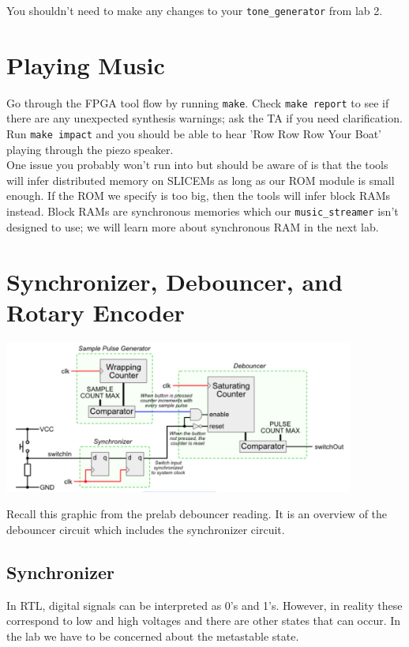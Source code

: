 \documentclass[11pt]{article}
\begin{document}
You shouldn't need to make any changes to your \verb|tone_generator| from lab 2.

\section{Playing Music}
Go through the FPGA tool flow by running \verb|make|. Check \verb|make report| to see if there are any unexpected synthesis warnings; ask the TA if you need clarification. Run \verb|make impact| and you should be able to hear 'Row Row Row Your Boat' playing through the piezo speaker. \\

{\footnotesize * One issue you probably won't run into but should be aware of is that the tools will infer distributed memory on SLICEMs as long as our ROM module is small enough. If the ROM we specify is too big, then the tools will infer block RAMs instead. Block RAMs are synchronous memories which our \verb|music_streamer| isn't designed to use; we will learn more about synchronous RAM in the next lab.}

\section{Synchronizer, Debouncer, and Rotary Encoder}

\begin{center}
\includegraphics[height=5cm]{images/lab2_fig2.png}
\end{center}

Recall this graphic from the prelab debouncer reading. It is an overview of the debouncer circuit which includes the synchronizer circuit.

\subsection{Synchronizer}
In RTL, digital signals can be interpreted as 0's and 1's. However, in reality these correspond to low and high voltages and there are other states that can occur. In the lab we have to be concerned about the metastable state.
\end{document}
